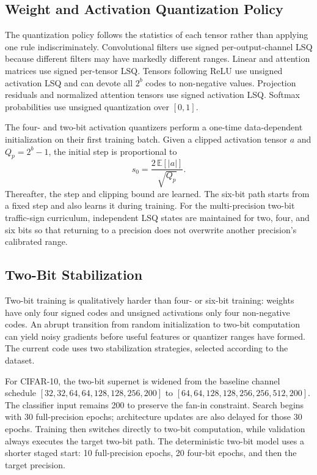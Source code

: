 \documentclass[lettersize,journal]{IEEEtran}
\begin{document}
\subsection{Weight and Activation Quantization Policy}
The quantization policy follows the statistics of each tensor rather than applying one rule indiscriminately. Convolutional filters use signed per-output-channel LSQ because different filters may have markedly different ranges. Linear and attention matrices use signed per-tensor LSQ. Tensors following ReLU use unsigned activation LSQ and can devote all $2^b$ codes to non-negative values. Projection residuals and normalized attention tensors use signed activation LSQ. Softmax probabilities use unsigned quantization over $[0,1]$.

The four- and two-bit activation quantizers perform a one-time data-dependent initialization on their first training batch. Given a clipped activation tensor $a$ and $Q_p=2^b-1$, the initial step is proportional to
\begin{equation}
s_0=\frac{2\,\mathbb{E}[|a|]}{\sqrt{Q_p}}.
\label{eq:actinit}
\end{equation}
Thereafter, the step and clipping bound are learned. The six-bit path starts from a fixed step and also learns it during training. For the multi-precision two-bit traffic-sign curriculum, independent LSQ states are maintained for two, four, and six bits so that returning to a precision does not overwrite another precision's calibrated range.

\subsection{Two-Bit Stabilization}
Two-bit training is qualitatively harder than four- or six-bit training: weights have only four signed codes and unsigned activations only four non-negative codes. An abrupt transition from random initialization to two-bit computation can yield noisy gradients before useful features or quantizer ranges have formed. The current code uses two stabilization strategies, selected according to the dataset.

For CIFAR-10, the two-bit supernet is widened from the baseline channel schedule $[32,32,64,64,128,128,256,200]$ to $[64,64,128,128,256,256,512,200]$. The classifier input remains 200 to preserve the fan-in constraint. Search begins with 30 full-precision epochs; architecture updates are also delayed for those 30 epochs. Training then switches directly to two-bit computation, while validation always executes the target two-bit path. The deterministic two-bit model uses a shorter staged start: 10 full-precision epochs, 20 four-bit epochs, and then the target precision.
\end{document}

